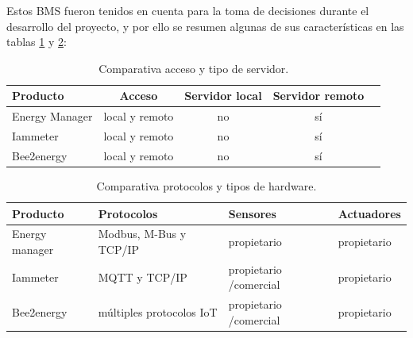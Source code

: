 \documentclass[a4paper, 12pt]{article}
\begin{document}
Estos BMS fueron tenidos en cuenta para la toma de decisiones durante el desarrollo del proyecto, y por ello se resumen algunas de sus características en las tablas \ref{tab:tabla2} y \ref{tab:tabla3}:



\begin{table}[h]
	\centering
	\caption[Comparativa de soluciones entre acceso y servidor]{Comparativa acceso y tipo de servidor.}
	\begin{tabular}{l c c c c }    
		\toprule
		\textbf{Producto} & \textbf{Acceso} & \textbf{Servidor  local}   & \textbf{Servidor remoto} \\
		\midrule
		Energy Manager & local y remoto 	& no & sí  \\		
		Iammeter	 & local y remoto	& no & sí  \\
		Bee2energy	 & local y remoto	& no & sí  \\
		\bottomrule
		\hline
	\end{tabular}
	\label{tab:tabla2}
\end{table}




\begin{table}[h]
	\centering
	\caption[Comparativa de soluciones entre protocolos y hardware]{Comparativa protocolos y tipos de hardware.}
	\begin{tabular}{l p{4.5cm} p{4cm} p{2cm}}    
		\toprule
		\textbf{Producto} 	 & \textbf{Protocolos}  & \textbf{ Sensores} & \textbf{Actuadores}  \\
		\midrule
		Energy manager & Modbus, M-Bus  y TCP/IP 	& propietario & propietario \\		
		Iammeter	 & MQTT y TCP/IP	& propietario /comercial & propietario\\
		Bee2energy	 & múltiples protocolos IoT		& propietario /comercial & propietario\\
		\bottomrule
		\hline
	\end{tabular}
	\label{tab:tabla3}
\end{table}
\end{document}
